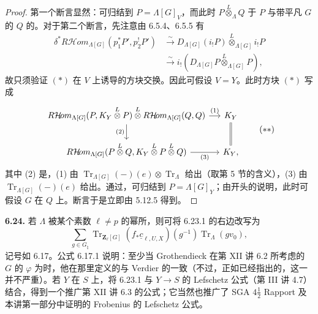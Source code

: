 \begin{proof}第一个断言显然：可归结到 $P=\Lambda[G]_V$，而此时 $P\overset L\otimes_\Lambda Q$ 于 $P$ 与带平凡 $G$ 的 $Q$ 的。对于第二个断言，先注意由 6.5.4、6.5.5 有
\[\begin{aligned}
\delta^*R\mathcal H\!om_{\Lambda[G]}(p_1^*P',p_2^!P')&\xrightarrow\sim D_{\Lambda[G]}(i_!P)\overset L\otimes_{\Lambda[G]}i_!P\\
&\xrightarrow\sim i_!(D_{\Lambda[G]}P\overset L\otimes_{\Lambda[G]}P),
\end{aligned}\]
故只须验证 $(*)$ 在 $V$ 上诱导的方块交换。因此可假设 $V=Y$。此时方块 $(*)$ 写成
\[\begin{tikzcd}[column sep=small]
R\mathcal H\!om_{\Lambda[G]}(P,K_Y\overset L\otimes P)\overset L\otimes R\mathcal H\!om_{\Lambda[G]}(Q,Q)\arrow[r,"(1)"]\arrow[d,"(2)"']&K_Y\arrow[d,equal]\\
R\mathcal H\!om_{\Lambda[G]}(P\overset L\otimes Q,K_Y\overset L\otimes P\overset L\otimes Q)\arrow[r,"(3)"']&K_Y,
\end{tikzcd}\tag{$**$}\]
其中 (2) 是，(1) 由 $\operatorname{Tr}_{\Lambda[G]}(-)(e)\otimes\operatorname{Tr}_\Lambda$ 给出（取第 5 节的含义），(3) 由 $\operatorname{Tr}_{\Lambda[G]}(-)(e)$ 给出。通过，可归结到 $P=\Lambda[G]_Y$；由开头的说明，此时可假设 $G$ 在 $Q$ 上。断言于是立即由 5.12.5 得到。\end{proof}

\textbf{6.24.} 若 $\Lambda$ 被某个素数 $\ell\ne p$ 的幂所，则可将 6.23.1 的右边改写为
\[\sum_{g\in G_\natural}\operatorname{Tr}_{\mathbf Z_\ell[G]}(f_*\underline c_{\ell,U,X})(g^{-1})\operatorname{Tr}_\Lambda(gv_0),\]
记号如 6.17。公式 6.17.1 说明：至少当 Grothendieck 在第 XII 讲 6.2 所考虑的 $G$ 的 $\varphi$ 为时，他在那里定义的与 Verdier 的一致（不过，正如已经指出的，这一并不严重）。若 $Y$ 在 $S$ 上，将 6.23.1 与 $Y\to S$ 的 Lefschetz 公式（第 III 讲 4.7）结合，得到一个推广第 XII 讲 6.3 的公式；它当然也推广了 SGA $4\frac12$ Rapport 及本讲第一部分中证明的 Frobenius 的 Lefschetz 公式。

